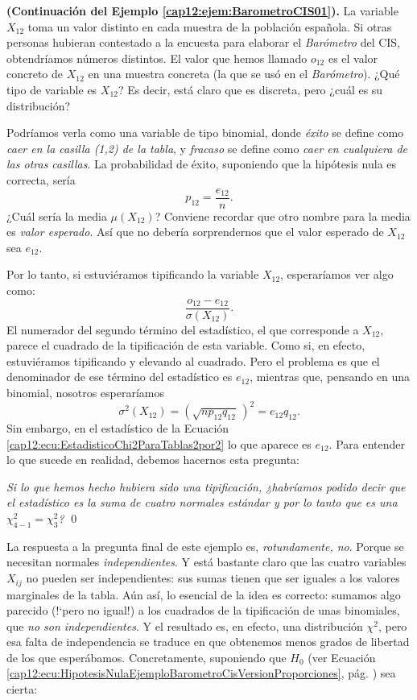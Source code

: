 \begin{ejemplo}{\bf (Continuación del Ejemplo \ref{cap12:ejem:BarometroCIS01}).}
\label{cap12:ejem:BarometroCIS02}
La variable $X_{12}$ toma un valor distinto en cada muestra de la población española. Si otras personas hubieran contestado a la encuesta para elaborar el {\em Barómetro} del CIS, obtendríamos números distintos. El valor que hemos llamado $o_{12}$ es el valor concreto de $X_{12}$ en una muestra concreta (la que se usó en el {\em Barómetro}). ¿Qué tipo de variable es $X_{12}$? Es decir, está claro que es discreta, pero ¿cuál es su distribución?

Podríamos verla como una variable de tipo binomial, donde {\em éxito} se define como {\em caer en la casilla (1,2) de la tabla}, y {\em fracaso} se define como {\em caer en cualquiera de las otras casillas}. La probabilidad de éxito, {\sf suponiendo que la hipótesis nula es correcta}, sería
    \[p_{12}=\dfrac{e_{12}}{n}.\]
¿Cuál sería la media $\mu(X_{12})$? Conviene recordar que otro nombre para la media es {\em valor esperado}. Así que no debería sorprendernos que el valor esperado de $X_{12}$ sea $e_{12}$.

Por lo tanto, si estuviéramos tipificando la variable $X_{12}$, esperaríamos ver algo como:
    \[\dfrac{o_{12}-e_{12}}{\sigma(X_{12})}.\]
El numerador del segundo término del estadístico, el que corresponde a $X_{12}$, parece el cuadrado de la tipificación de esta variable. Como si, en efecto, estuviéramos tipificando y elevando al cuadrado. Pero el problema es que el denominador de ese término del estadístico es $e_{12}$, mientras que, pensando en una binomial, nosotros esperaríamos
        \[\sigma^2(X_{12})=\left(\sqrt{n p_{12} q_{12}}\,\right)^2=e_{12} q_{12}.\]
Sin embargo, en el estadístico de la Ecuación \ref{cap12:ecu:EstadisticoChi2ParaTablas2por2} lo que aparece es $e_{12}$. Para entender lo que sucede en realidad, debemos hacernos esta pregunta:

{\em Si lo que hemos hecho hubiera sido una tipificación, ¿habríamos podido decir que el estadístico es la suma de cuatro normales estándar y por lo tanto que es una $\chi^2_{4-1}=\chi^2_3$?}
\qed
\end{ejemplo}

La respuesta a la pregunta final de este ejemplo es, {\em rotundamente, no}. Porque se necesitan normales {\em independientes}. Y está bastante claro que las cuatro variables $X_{ij}$ no pueden ser independientes: sus sumas tienen que ser iguales a los valores marginales de la tabla.  Aún así, lo esencial de la idea es correcto: sumamos algo parecido ({!`}pero no igual!) a los cuadrados de la tipificación de unas binomiales, que {\em no son independientes}. Y el resultado es, en efecto, una distribución $\chi^2$, pero esa falta de independencia se traduce en que obtenemos menos grados de libertad de los que esperábamos. Concretamente, suponiendo que $H_0$ (ver Ecuación \ref{cap12:ecu:HipotesisNulaEjemploBarometroCisVersionProporciones}, pág. \pageref{cap12:ecu:HipotesisNulaEjemploBarometroCisVersionProporciones}) sea cierta:\\[3mm]

